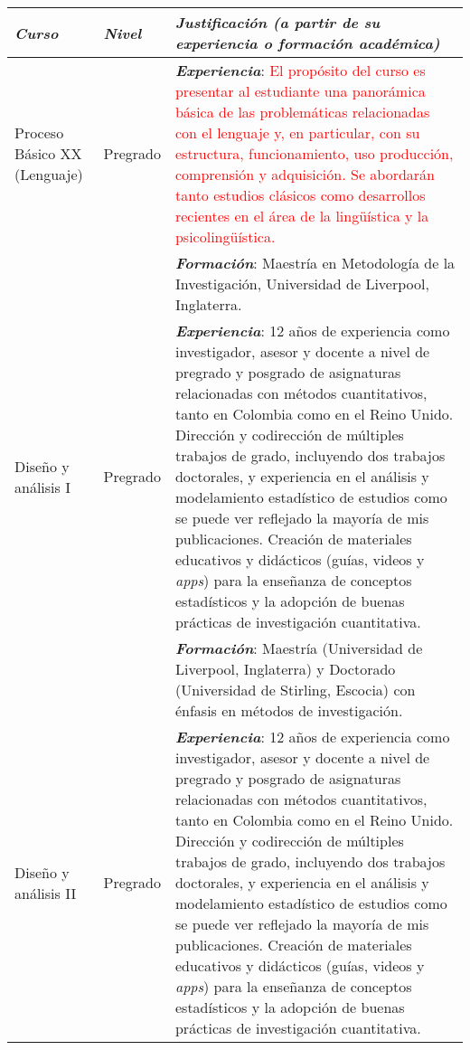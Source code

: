 \documentclass[11pt,a4paper,]{awesome-cv}
\begin{document}
\begin{table}[!h]
\centering\begingroup\fontsize{9}{11}\selectfont

\begin{tabular}{|>{\centering\arraybackslash}p{7em}|>{\centering\arraybackslash}p{6em}|>{\raggedright\arraybackslash}p{40em}|}
\hline
\em{\textbf{Curso}} & \em{\textbf{Nivel}} & \em{\textbf{Justificación (a partir de su experiencia o formación académica)}}\\
\hline
\vfill \vfill Proceso Básico XX (Lenguaje) & \vfill \vfill Pregrado & \textit{\textbf{Experiencia}}: \textcolor{red}{El propósito del curso es presentar al estudiante una panorámica básica de las problemáticas relacionadas con el lenguaje y, en particular, con su estructura, funcionamiento, uso producción, comprensión y adquisición. Se abordarán tanto estudios clásicos como desarrollos recientes en el área de la lingüística y la psicolingüística.}\\
 &  & \textit{\textbf{Formación}}: Maestría en Metodología de la Investigación, Universidad de Liverpool, Inglaterra.\\
\hline
\vfill \vfill Diseño y análisis
I & \vfill \vfill Pregrado & \textit{\textbf{Experiencia}}: 12 años de experiencia como investigador, asesor y docente a nivel de pregrado y posgrado de asignaturas relacionadas con métodos cuantitativos, tanto en Colombia como en el Reino Unido. Dirección y codirección de múltiples trabajos de grado, incluyendo dos trabajos doctorales, y experiencia en el análisis y modelamiento estadístico de estudios como se puede ver reflejado la mayoría de mis publicaciones. Creación de materiales educativos y didácticos (guías, videos y \textit{apps}) para la enseñanza de conceptos estadísticos y la adopción de buenas prácticas de investigación cuantitativa.\\
 &  & \textit{\textbf{Formación}}: Maestría (Universidad de Liverpool, Inglaterra) y Doctorado (Universidad de Stirling, Escocia) con énfasis en métodos de \vphantom{3} investigación.\\
\hline
\vfill \vfill Diseño y análisis
II & \vfill \vfill Pregrado & \textit{\textbf{Experiencia}}: 12 años de experiencia como investigador, asesor y docente a nivel de pregrado y posgrado de asignaturas relacionadas con métodos cuantitativos, tanto en Colombia como en el Reino Unido. Dirección y codirección de múltiples trabajos de grado, incluyendo dos trabajos doctorales, y experiencia en el análisis y modelamiento estadístico de estudios como se puede ver reflejado la mayoría de mis publicaciones. Creación de materiales educativos y didácticos (guías, videos y \textit{apps}) para la enseñanza de conceptos estadísticos y la adopción de buenas prácticas de investigación cuantitativa.\\

\end{tabular}
\end{table}
\end{document}
